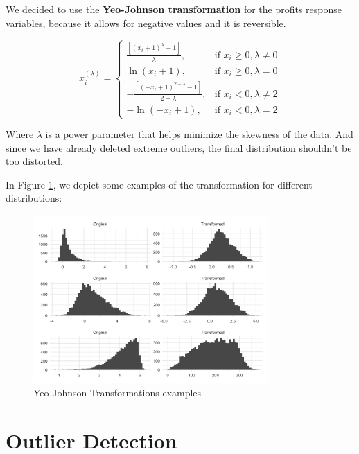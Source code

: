 \documentclass[11pt,english,a4paper,hidelinks]{book}
\begin{document}
\vspace{0.5cm}
\noindent We decided to use the \textbf{Yeo-Johnson transformation} for the profits response variables, because it allows for negative values and it is reversible.

\begin{equation}
x_i^{(\lambda)} =
\begin{cases}
\frac{[(x_i + 1)^\lambda - 1]}{\lambda}, & \text{if } x_i \geq 0, \lambda \neq 0 \\
\ln(x_i + 1), & \text{if } x_i \geq 0, \lambda = 0 \\
-\frac{[(-x_i + 1)^{2 - \lambda} - 1]}{2 - \lambda}, & \text{if } x_i < 0, \lambda \neq 2 \\
-\ln(-x_i + 1), & \text{if } x_i < 0, \lambda = 2
\end{cases}
\end{equation}

\noindent Where \(\lambda\) is a power parameter that helps minimize the skewness of the data. And since we have already deleted extreme outliers, the final distribution shouldn't be too distorted.

\vspace{0.5cm}

\noindent In Figure \ref{fig:yeo-johnson}, we depict some examples of the transformation for different distributions:

\begin{figure}[H]
    \centering
    \includegraphics[width=0.8\textwidth]{images/code/transformations/yeo-johnson.png}
    \caption{Yeo-Johnson Transformations examples}
    \label{fig:yeo-johnson}
\end{figure}


\section{Outlier Detection}
\end{document}
